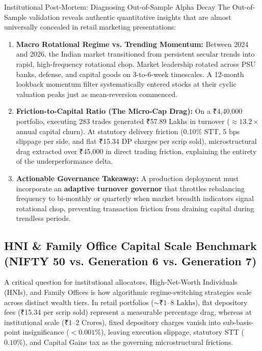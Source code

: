 \documentclass[11pt,a4paper]{article}
\begin{document}
\begin{warningbox}{Institutional Post-Mortem: Diagnosing Out-of-Sample Alpha Decay}
The Out-of-Sample validation reveals authentic quantitative insights that are almost universally concealed in retail marketing presentations:
\begin{enumerate}[leftmargin=*]
    \item \textbf{Macro Rotational Regime vs. Trending Momentum:} Between 2024 and 2026, the Indian market transitioned from persistent secular trends into rapid, high-frequency rotational chop. Market leadership rotated across PSU banks, defense, and capital goods on 3-to-6-week timescales. A 12-month lookback momentum filter systematically entered stocks at their cyclic valuation peaks just as mean-reversion commenced.
    \item \textbf{Friction-to-Capital Ratio (The Micro-Cap Drag):} On a ₹4,40,000 portfolio, executing 283 trades generated ₹57.89 Lakhs in turnover ($\approx 13.2\times$ annual capital churn). At statutory delivery friction (0.10\% STT, 5 bps slippage per side, and flat ₹15.34 DP charges per scrip sold), microstructural drag extracted over ₹45,000 in direct trading friction, explaining the entirety of the underperformance delta.
    \item \textbf{Actionable Governance Takeaway:} A production deployment must incorporate an \textbf{adaptive turnover governor} that throttles rebalancing frequency to bi-monthly or quarterly when market breadth indicators signal rotational chop, preventing transaction friction from draining capital during trendless periods.
\end{enumerate}
\end{warningbox}

\subsection{HNI \& Family Office Capital Scale Benchmark (NIFTY 50 vs. Generation 6 vs. Generation 7)}

A critical question for institutional allocators, High-Net-Worth Individuals (HNIs), and Family Offices is how algorithmic regime-switching strategies scale across distinct wealth tiers. In retail portfolios ($\sim \text{₹1--8 Lakhs}$), flat depository fees (₹15.34 per scrip sold) represent a measurable percentage drag, whereas at institutional scale ($\text{₹1--2 Crores}$), fixed depository charges vanish into sub-basis-point insignificance ($<0.001\%$), leaving execution slippage, statutory STT ($0.10\%$), and Capital Gains tax as the governing microstructural frictions.
\end{document}
